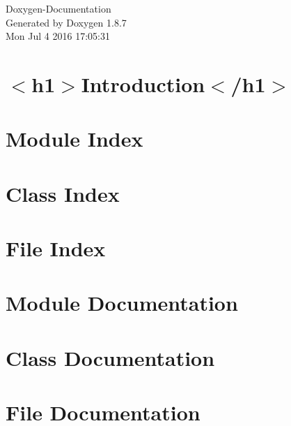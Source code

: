 \documentclass[twoside]{book}
\newcommand{\+}{\discretionary{\mbox{\scriptsize$\hookleftarrow$}}{}{}}
\newcommand{\clearemptydoublepage}{%
  \newpage{\pagestyle{empty}\cleardoublepage}%
}
\begin{document}
\hypersetup{pageanchor=false,
             bookmarks=true,
             bookmarksnumbered=true,
             pdfencoding=unicode
            }
\begin{titlepage}
\vspace*{7cm}
\begin{center}%
{\Large Doxygen-\/\+Documentation }\\
\vspace*{1cm}
{\large Generated by Doxygen 1.8.7}\\
\vspace*{0.5cm}
{\small Mon Jul 4 2016 17:05:31}\\
\end{center}
\end{titlepage}
\clearemptydoublepage
\tableofcontents
\clearemptydoublepage
{}
\hypersetup{pageanchor=true}

\chapter{$<$h1$>$Introduction$<$/h1$>$}
\label{index}\hypertarget{index}{}
\chapter{Module Index}

\chapter{Class Index}

\chapter{File Index}

\chapter{Module Documentation}





\chapter{Class Documentation}

















\chapter{File Documentation}






\newpage
{}
{}
\printindex
\end{document}
